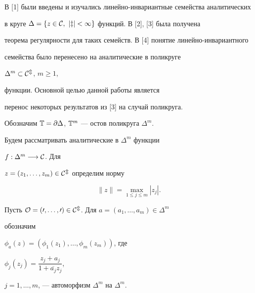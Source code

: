 \date{}




\pagestyle{plain} %







\maketitle


\label{begin}





В [1] были введены и изучались линейно-инвариантные семейства аналитических


в круге $\Delta =\{z\in\cal C,\ |z|<1\}$ функций. В [2], [3] была получена


теорема регулярности для таких семейств. В [4] понятие линейно-инвариантного


семейства было перенесено на аналитические в поликруге


$\Delta^m\subset\cal C^m$, $m\ge 1$,


функции. Основной целью данной работы является


перенос некоторых результатов из [3] на случай поликруга.





Обозначим $\Bbb T=\partial \Delta$, $\Bbb T^m$ --- остов поликруга $\Delta^m$.


Будем рассматривать аналитические в $\Delta^m$ функции


$f:\Delta^m\longrightarrow \cal C$. Для


$z=(z_1,\dotsc,z_m)\in\cal C^m$ определим норму


$$


\|z\|=\max_{1\leq j\leq m}|z_j|.


$$


Пусть $\cal O=(0,\dotsc,0)\in\cal C^m$. Для $a=(a_1,\dotsc,a_m)\in\Delta^m$


обозначим


$\phi_a(z)=(\phi_1(z_1),\dotsc,\phi_m(z_m))$, где


$\phi_j(z_j)=\dfrac{z_j+a_j}{1+\overline{a_j}z_j}$,


$j=1,\dotsc,m$, --- автоморфизм $\Delta^m$ на $\Delta^m$.





